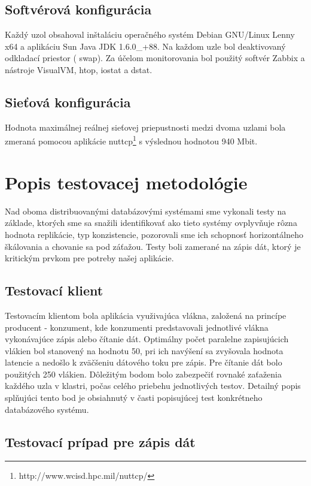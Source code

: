 \documentclass[11pt,twoside,a4paper]{book}
\begin{document}
\subsection*{Softvérová konfigurácia} 
Každý uzol obsahoval inštaláciu operačného systém Debian GNU/Linux Lenny x64 a aplikáciu Sun Java JDK 1.6.0\_+88. Na každom uzle bol deaktivovaný odkladací priestor ( swap). Za účelom monitorovania bol použitý softvér Zabbix a nástroje VisualVM, htop, iostat a dstat.

\subsection*{Sieťová konfigurácia}

Hodnota maximálnej reálnej sieťovej priepustnosti medzi dvoma uzlami bola zmeraná pomocou aplikácie nuttcp\footnote{http://www.wcisd.hpc.mil/nuttcp/} s výslednou hodnotou 940 Mbit.

\section{Popis testovacej metodológie}

Nad oboma distribuovanými databázovými systémami sme vykonali testy na základe, ktorých sme sa snažili identifikovať ako tieto systémy ovplyvňuje rôzna hodnota replikácie, typ konzistencie, pozorovali sme ich schopnosť horizontálneho škálovania a chovanie sa pod záťažou. Testy boli zamerané na zápis dát, ktorý je kritickým prvkom pre potreby našej aplikácie.

\subsection{Testovací klient}

Testovacím klientom bola aplikácia využivajúca vlákna, založená na princípe producent - konzument, kde konzumenti predstavovali jednotlivé vlákna vykonávajúce zápis alebo čítanie dát. Optimálny počet paralelne zapisujúcich vlákien bol stanovený na hodnotu 50, pri ich navýšení sa zvyšovala hodnota latencie a nedošlo k zväčšeniu dátového toku pre zápis. Pre čítanie dát bolo použitých 250 vlákien. Dôležitým bodom bolo zabezpečiť rovnaké zaťaženia každého uzla v klastri, počas celého priebehu jednotlivých testov. Detailný popis splňujúci tento bod je obsiahnutý v časti popisujúcej test konkrétneho databázového systému.

\subsection{Testovací prípad pre zápis dát}
\end{document}
